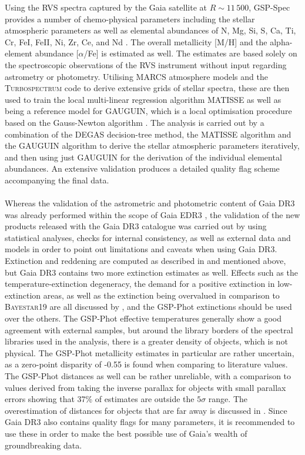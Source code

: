 \documentclass[a4paper,11pt]{article}
\begin{document}
Using the RVS spectra captured by the Gaia satellite at $R\sim11\,500$, GSP-Spec provides a number of chemo-physical parameters including the stellar atmospheric parameters as well as elemental abundances of N, Mg, Si, S, Ca, Ti, Cr, FeI, FeII, Ni, Zr, Ce, and Nd \citep{recioblanco23}. The overall metallicity [M/H] and the alpha-element abundance [$\alpha$/Fe] is estimated as well. The estimates are based solely on the spectroscopic observations of the RVS instrument without input regarding astrometry or photometry. Utilising \textsc{MARCS} atmosphere models \citep{marcs} and the \textsc{Turbospectrum} code \citep{turbospectrum} to derive extensive grids of stellar spectra, these are then used to train the local multi-linear regression algorithm MATISSE as well as being a reference model for GAUGUIN, which is a local optimisation procedure based on the Gauss-Newton algorithm \citep{recioblanco16}. The analysis is carried out by a combination of the DEGAS decision-tree method, the MATISSE algorithm and the GAUGUIN algorithm to derive the stellar atmospheric parameters iteratively, and then using just GAUGUIN for the derivation of the individual elemental abundances. An extensive validation produces a detailed quality flag scheme accompanying the final data.\\ \\
%
Whereas the validation of the astrometric and photometric content of Gaia DR3 was already performed within the scope of Gaia EDR3 \citep{fabricius21}, the validation of the new products released with the Gaia DR3 catalogue was carried out by \citet{babu23} using statistical analyses, checks for internal consistency, as well as external data and models in order to point out limitations and caveats when using Gaia DR3. Extinction and reddening are computed as described in \citet{andrae22} and mentioned above, but Gaia DR3 contains two more extinction estimates as well. Effects such as the temperature-extinction degeneracy, the demand for a positive extinction in low-extinction areas, as well as the extinction being overvalued in comparison to \textsc{Bayestar19} \citep{green19} are all discussed by \citet{andrae22}, and the GSP-Phot extinctions should be used over the others. The GSP-Phot effective temperatures generally show a good agreement with external samples, but around the library borders of the spectral libraries used in the analysis, there is a greater density of objects, which is not physical. The GSP-Phot metallicity estimates in particular are rather uncertain, as a zero-point disparity of -0.55 is found when comparing to literature values. The GSP-Phot distances as well can be rather unreliable, with a comparison to values derived from taking the inverse parallax for objects with small parallax errors showing that 37\% of estimates are outside the $5\sigma$ range. The overestimation of distances for objects that are far away is discussed in \citet{andrae22}. Since Gaia DR3 also contains quality flags for many parameters, it is recommended to use these in order to make the best possible use of Gaia's wealth of groundbreaking data.
%
\end{document}
